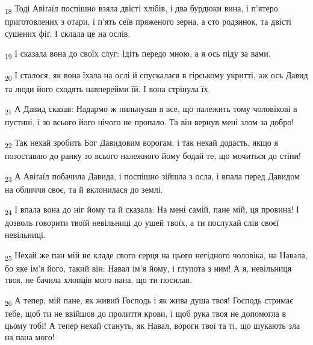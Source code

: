 \begin{tcolorbox}
\textsubscript{18} Тоді Авіґаїл поспішно взяла двісті хлібів, і два бурдюки вина, і п'ятеро приготовлених з отари, і п'ять сеїв пряженого зерна, а сто родзинок, та двісті сушених фіґ. І склала це на ослів.
\end{tcolorbox}
\begin{tcolorbox}
\textsubscript{19} І сказала вона до своїх слуг: Ідіть передо мною, а я ось піду за вами.
\end{tcolorbox}
\begin{tcolorbox}
\textsubscript{20} І сталося, як вона їхала на ослі й спускалася в гірському укритті, аж ось Давид та люди його сходять навперейми їй. І вона стрінула їх.
\end{tcolorbox}
\begin{tcolorbox}
\textsubscript{21} А Давид сказав: Надармо ж пильнував я все, що належить тому чоловікові в пустині, і зо всього його нічого не пропало. Та він вернув мені злом за добро!
\end{tcolorbox}
\begin{tcolorbox}
\textsubscript{22} Так нехай зробить Бог Давидовим ворогам, і так нехай додасть, якщо я позоставлю до ранку зо всього належного йому бодай те, що мочиться до стіни!
\end{tcolorbox}
\begin{tcolorbox}
\textsubscript{23} А Авіґаїл побачила Давида, і поспішно зійшла з осла, і впала перед Давидом на обличчя своє, та й вклонилася до землі.
\end{tcolorbox}
\begin{tcolorbox}
\textsubscript{24} І впала вона до ніг йому та й сказала: На мені самій, пане мій, ця провина! І дозволь говорити твоїй невільниці до ушей твоїх, а ти послухай слів своєї невільниці.
\end{tcolorbox}
\begin{tcolorbox}
\textsubscript{25} Нехай же пан мій не кладе свого серця на цього негідного чоловіка, на Навала, бо яке ім'я його, такий він: Навал ім'я йому, і глупота з ним! А я, невільниця твоя, не бачила хлопців мого пана, що ти посилав.
\end{tcolorbox}
\begin{tcolorbox}
\textsubscript{26} А тепер, мій пане, як живий Господь і як жива душа твоя! Господь стримає тебе, щоб ти не ввійшов до пролиття крови, і щоб рука твоя не допомогла в цьому тобі! А тепер нехай стануть, як Навал, вороги твої та ті, що шукають зла на пана мого!
\end{tcolorbox}
